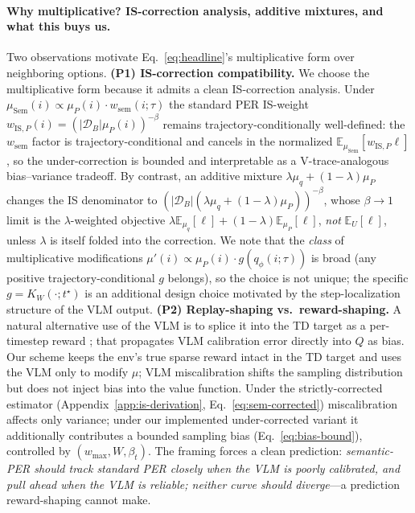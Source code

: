 \documentclass{article}
\begin{document}
\paragraph{Why multiplicative? IS-correction analysis, additive mixtures, and what this buys us.}
Two observations motivate Eq.~\eqref{eq:headline}'s multiplicative form over
neighboring options. \textbf{(P1) IS-correction compatibility.}
We choose the multiplicative form because it admits a clean IS-correction
analysis. Under $\mu_{\text{Sem}}(i)\propto\mu_P(i)\cdot w_{\text{sem}}(i;\tau)$
the standard PER IS-weight
$w_{\text{IS},P}(i)=(|\mathcal{D}_B|\mu_P(i))^{-\beta}$
remains trajectory-conditionally well-defined: the $w_{\text{sem}}$ factor
is trajectory-conditional and cancels in the normalized
$\mathbb{E}_{\mu_{\text{Sem}}}[w_{\text{IS},P}\ell]$, so the under-correction
is bounded and interpretable as a V-trace-analogous bias--variance tradeoff.
By contrast, an additive mixture $\lambda \mu_q + (1\!-\!\lambda)\mu_P$
\citep{sharony2026vlmrb} changes the IS denominator to
$(|\mathcal{D}_B|(\lambda\mu_q+(1\!-\!\lambda)\mu_P))^{-\beta}$, whose
$\beta\!\to\!1$ limit is the $\lambda$-weighted objective
$\lambda\mathbb{E}_{\mu_q}[\ell]+(1\!-\!\lambda)\mathbb{E}_{\mu_P}[\ell]$,
\emph{not} $\mathbb{E}_U[\ell]$, unless $\lambda$ is itself folded into the
correction. We note that the \emph{class} of multiplicative modifications
$\mu'(i)\propto\mu_P(i)\cdot g(q_\phi(i;\tau))$ is broad (any positive
trajectory-conditional $g$ belongs), so the choice is not unique; the
specific $g=K_W(\cdot;t^\star)$ is an additional design choice motivated
by the step-localization structure of the VLM output.
\textbf{(P2) Replay-shaping vs.\ reward-shaping.} A natural alternative use of the VLM
is to splice it into the TD target as a per-timestep reward
\citep{wu2026largerewardmodels,patel2025iker,rocamonde2024vlmreward};
that propagates VLM calibration error directly into $Q$ as bias. Our scheme
keeps the env's true sparse reward intact in the TD target and uses the VLM
only to modify $\mu$; VLM miscalibration shifts the sampling distribution
but does not inject bias into the value function. Under the strictly-corrected
estimator (Appendix~\ref{app:is-derivation}, Eq.~\eqref{eq:sem-corrected})
miscalibration affects only variance; under our implemented under-corrected
variant it additionally contributes a bounded sampling bias
(Eq.~\eqref{eq:bias-bound}), controlled by $(w_{\max},W,\beta_t)$. The framing
forces a clean prediction: \emph{semantic-PER should track standard PER
closely when the VLM is poorly calibrated, and pull ahead when the VLM is
reliable; neither curve should diverge}---a prediction reward-shaping cannot
make.
\end{document}
